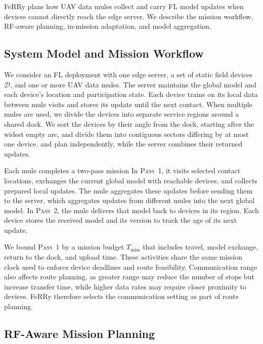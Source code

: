 \documentclass[conference]{IEEEtran}
\newcommand{\sysname}{FeRRy}
\begin{document}
\sysname{} plans how UAV data mules collect and carry FL model updates when
devices cannot directly reach the edge server. We describe the mission workflow,
RF-aware planning, in-mission adaptation, and model aggregation.

\subsection{System Model and Mission Workflow}
\label{sec:system-model}


We consider an FL deployment with one edge server, a set of
static field devices $\mathcal{D}$, and one or more UAV data mules. The server maintains the global
model and each device's location and participation state. Each device trains on its local data between
mule visits and stores its update until the next contact. When multiple mules are used, we divide the devices into separate service
regions around a shared dock. We sort the devices by their angle from the dock,
starting after the widest empty arc, and divide them into contiguous sectors differing by at most one device. and
plan independently, while the server combines their returned updates.

Each mule completes a two-pass mission In \textsc{Pass~1}, it visits selected contact
locations, exchanges the current global model with reachable devices, and
collects prepared local updates. The mule aggregates these updates before
sending them to the server, which aggregates updates from different mules into the
next global model. In \textsc{Pass~2}, the mule delivers that model back to devices
in its region. Each device stores the received model and its version to track the age of its next update.

We bound \textsc{Pass~1} by a mission budget $T_{\mathrm{miss}}$ that includes
travel, model exchange, return to the dock, and upload time. These activities
share the same mission clock used to enforce device deadlines and route feasibility.
Communication range also affects route planning, as greater range may reduce the number of stops but increase transfer time, while higher data rates may require closer proximity to devices. \sysname{} therefore selects the
communication setting as part of route planning.

\subsection{RF-Aware Mission Planning}
\label{sec:mission-planning}
\end{document}
